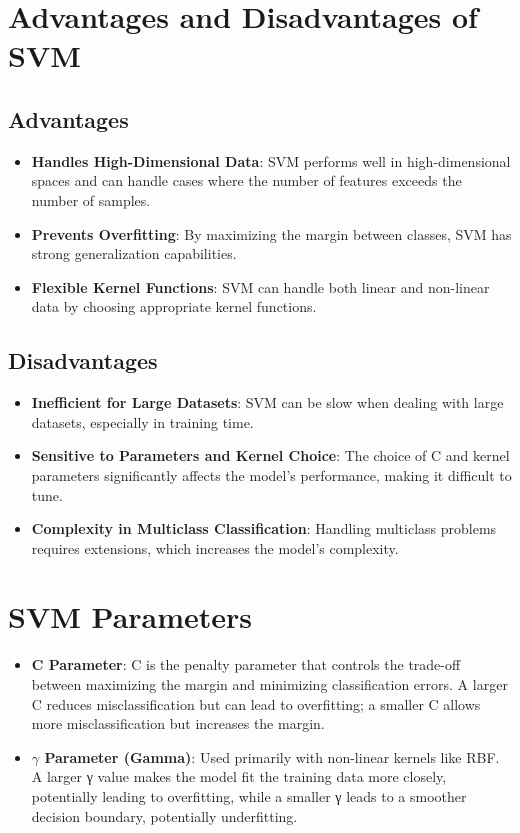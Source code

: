 \documentclass{article}
\begin{document}
	\section{Advantages and Disadvantages of SVM}
	
	\subsection{Advantages}
	
	\begin{itemize}
		\item \textbf{Handles High-Dimensional Data}: SVM performs well in high-dimensional spaces and can handle cases where the number of features exceeds the number of samples.
		\item \textbf{Prevents Overfitting}: By maximizing the margin between classes, SVM has strong generalization capabilities.
		\item \textbf{Flexible Kernel Functions}: SVM can handle both linear and non-linear data by choosing appropriate kernel functions.
	\end{itemize}
	
	\subsection{Disadvantages}
	
	\begin{itemize}
		\item \textbf{Inefficient for Large Datasets}: SVM can be slow when dealing with large datasets, especially in training time.
		\item \textbf{Sensitive to Parameters and Kernel Choice}: The choice of C and kernel parameters significantly affects the model's performance, making it difficult to tune.
		\item \textbf{Complexity in Multiclass Classification}: Handling multiclass problems requires extensions, which increases the model's complexity.
	\end{itemize}
	
	\section{SVM Parameters}
	
	\begin{itemize}
		\item \textbf{C Parameter}: C is the penalty parameter that controls the trade-off between maximizing the margin and minimizing classification errors. A larger C reduces misclassification but can lead to overfitting; a smaller C allows more misclassification but increases the margin.
		\item \textbf{$γ$ Parameter (Gamma)}: Used primarily with non-linear kernels like RBF. A larger γ value makes the model fit the training data more closely, potentially leading to overfitting, while a smaller γ leads to a smoother decision boundary, potentially underfitting.
	\end{itemize}
	
\end{document}
